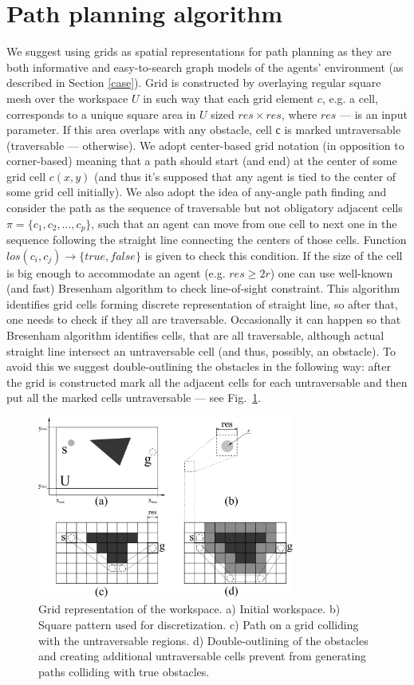 \documentclass[runningheads,a4paper]{llncs}
\begin{document}
\section{Path planning algorithm}\label{path}

We suggest using grids as spatial representations for path planning as they are both informative and easy-to-search graph models of the agents' environment (as described in Section \ref{case}). Grid is constructed by overlaying regular square mesh over the workspace $U$ in such way that each grid element $c$, e.g. a cell, corresponds to a unique square area in $U$ sized $res \times res$, where $res$ --- is an input parameter. If this area overlaps with any obstacle, cell с is marked untraversable (traversable --- otherwise). We adopt center-based grid notation (in opposition to corner-based) meaning that a path should start (and end) at the center of some grid cell $c(x, y)$ (and thus it's supposed that any agent is tied to the center of some grid cell initially). We also adopt the idea of any-angle path finding \cite{Nash2007} and consider the path as the sequence of traversable but not obligatory adjacent cells $\pi=\{c_1, c_2, \dots, c_p\}$, such that an agent can move from one cell to next one in the sequence following the straight line connecting the centers of those cells. Function $los(c_i, c_j)\rightarrow\{true, false\}$ is given to check this condition. If the size of the cell is big enough to accommodate an agent (e.g. $res\geq 2r$) one can use well-known (and fast) Bresenham algorithm \cite{Bresenham1965} to check line-of-sight constraint. This algorithm identifies grid cells forming discrete representation of straight line, so after that, one needs to check if they all are traversable. Occasionally it can happen so that Bresenham algorithm identifies cells, that are all traversable, although actual straight line intersect an untraversable cell (and thus, possibly, an obstacle). To avoid this we suggest double-outlining the obstacles in the following way: after the grid is constructed mark all the adjacent cells for each untraversable and then put all the marked cells untraversable --- see Fig.~\ref{fig:grid}.

\begin{figure}
	\centering
	\includegraphics[height=6cm]{path_grid}
	\caption{Grid representation of the workspace. a) Initial workspace. b) Square pattern used for discretization. c) Path on a grid colliding with the untraversable regions. d) Double-outlining of the obstacles and creating additional untraversable cells prevent from generating paths colliding with true obstacles.}
	\label{fig:grid}
\end{figure}
\end{document}

